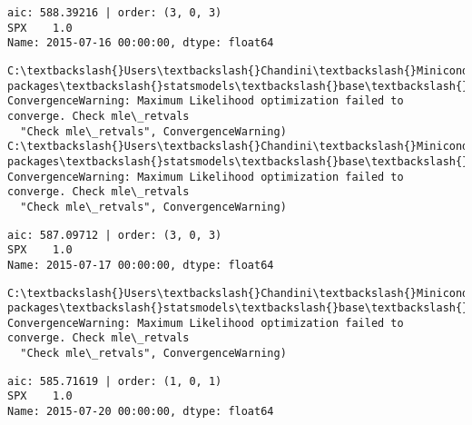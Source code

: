 \documentclass[11pt]{article}
\begin{document}
    \begin{Verbatim}[commandchars=\\\{\}]
aic: 588.39216 | order: (3, 0, 3)
SPX    1.0
Name: 2015-07-16 00:00:00, dtype: float64

    \end{Verbatim}

    \begin{Verbatim}[commandchars=\\\{\}]
C:\textbackslash{}Users\textbackslash{}Chandini\textbackslash{}Miniconda3\textbackslash{}envs\textbackslash{}auquan\textbackslash{}lib\textbackslash{}site-packages\textbackslash{}statsmodels\textbackslash{}base\textbackslash{}model.py:496: ConvergenceWarning: Maximum Likelihood optimization failed to converge. Check mle\_retvals
  "Check mle\_retvals", ConvergenceWarning)
C:\textbackslash{}Users\textbackslash{}Chandini\textbackslash{}Miniconda3\textbackslash{}envs\textbackslash{}auquan\textbackslash{}lib\textbackslash{}site-packages\textbackslash{}statsmodels\textbackslash{}base\textbackslash{}model.py:496: ConvergenceWarning: Maximum Likelihood optimization failed to converge. Check mle\_retvals
  "Check mle\_retvals", ConvergenceWarning)

    \end{Verbatim}

    \begin{Verbatim}[commandchars=\\\{\}]
aic: 587.09712 | order: (3, 0, 3)
SPX    1.0
Name: 2015-07-17 00:00:00, dtype: float64

    \end{Verbatim}

    \begin{Verbatim}[commandchars=\\\{\}]
C:\textbackslash{}Users\textbackslash{}Chandini\textbackslash{}Miniconda3\textbackslash{}envs\textbackslash{}auquan\textbackslash{}lib\textbackslash{}site-packages\textbackslash{}statsmodels\textbackslash{}base\textbackslash{}model.py:496: ConvergenceWarning: Maximum Likelihood optimization failed to converge. Check mle\_retvals
  "Check mle\_retvals", ConvergenceWarning)

    \end{Verbatim}

    \begin{Verbatim}[commandchars=\\\{\}]
aic: 585.71619 | order: (1, 0, 1)
SPX    1.0
Name: 2015-07-20 00:00:00, dtype: float64

    \end{Verbatim}
\end{document}
